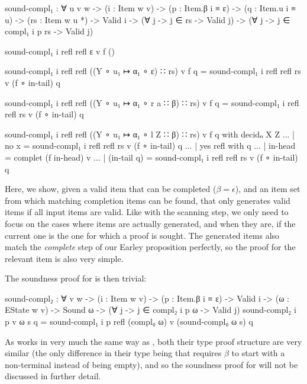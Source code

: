 		\begin{code}
			sound-compl₁ : ∀ {u v w} ->
			  (i : Item w v) ->
			  (p : Item.β i ≡ ε) ->
			  (q : Item.u i ≡ u) ->
			  (rs : Item w u *) ->
			  Valid i -> (∀ {j} -> j ∈ rs -> Valid j) ->
			  (∀ {j} -> j ∈ compl₁ i p rs -> Valid j)

			sound-compl₁ i refl refl ε v f ()

			sound-compl₁ i refl refl ((Y ∘ u₁ ↦ α₁ ∘ ε) ∷ rs) v f q =
			  sound-compl₁ i refl refl rs v (f ∘ in-tail) q

			sound-compl₁ i refl refl ((Y ∘ u₁ ↦ α₁ ∘ r a ∷ β) ∷ rs) v f q =
			  sound-compl₁ i refl refl rs v (f ∘ in-tail) q

			sound-compl₁ i refl refl ((Y ∘ u₁ ↦ α₁ ∘ l Z ∷ β) ∷ rs) v f q with decidₙ X Z
			... | no x = sound-compl₁ i refl refl rs v (f ∘ in-tail) q
			... | yes refl with q
			...            | in-head     = complet (f in-head) v
			...            | (in-tail q) = sound-compl₁ i refl refl rs v (f ∘ in-tail) q
		\end{code}

		Here, we show, given a valid item that can be completed ($\beta =
		\epsilon$), and an item set from which matching completion items can be
		found, that  only generates valid items if all input
		items are valid. Like with the scanning step, we only need to focus on
		the cases where items are actually generated, and when they are, if the
		current one is the one for which a proof is sought. The generated items
		also match the \emph{complete} step of our Earley proposition
		perfectly, so the proof for the relevant item is also very simple.

		The soundness proof for  is then trivial:

		\begin{code}
			sound-compl₂ : ∀ {v w} ->
			  (i : Item w v) ->
			  (p : Item.β i ≡ ε) ->
			  Valid i -> (ω : EState w v) -> Sound ω ->
			  (∀ {j} -> j ∈ compl₂ i p ω -> Valid j)
			sound-compl₂ i p v ω s q =
			  sound-compl₁ i p refl (compl₀ ω) v (sound-compl₀ ω s) q
		\end{code}

		As  works in very much the same way as
		, both their type proof structure are very similar (the
		only difference in their type being that  requires
		$\beta$ to start with a non-terminal instead of being empty), and so
		the soundness proof for  will not be discussed in
		further detail.

